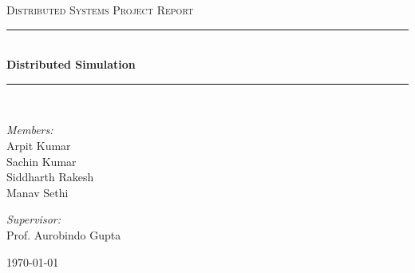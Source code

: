 \documentclass[12pt,a4paper]{article}
\newcommand{\HRule}{\rule{\linewidth}{0.5mm}}
\begin{document}


\begin{titlepage}
\begin{center}



\textsc{\Large Distributed Systems Project Report }\\[0.5cm]

\HRule \\[0.4cm]
{ \huge \bfseries Distributed Simulation \\[0.4cm] }

\HRule \\[1.5cm]

\begin{minipage}{0.4\textwidth}
\begin{flushleft} \large
\emph{Members:}\\
Arpit Kumar\\
Sachin Kumar\\
Siddharth Rakesh\\
Manav Sethi\\
\end{flushleft}
\end{minipage}
\begin{minipage}{0.4\textwidth}
\begin{flushright} \large
\emph{Supervisor:} \\
Prof. Aurobindo Gupta
\end{flushright}
\end{minipage}

\vfill

{\large \today}

\end{center}
\end{titlepage}

\tableofcontents
\newpage
\end{document}
